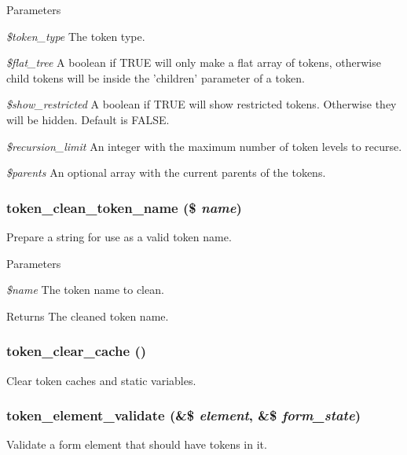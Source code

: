 \begin{DoxyParams}{Parameters}
\item[{\em \$token\_\-type}]The token type. \item[{\em \$flat\_\-tree}]A boolean if TRUE will only make a flat array of tokens, otherwise child tokens will be inside the 'children' parameter of a token. \item[{\em \$show\_\-restricted}]A boolean if TRUE will show restricted tokens. Otherwise they will be hidden. Default is FALSE. \item[{\em \$recursion\_\-limit}]An integer with the maximum number of token levels to recurse. \item[{\em \$parents}]An optional array with the current parents of the tokens. \end{DoxyParams}
\hypertarget{token_8module_aa3b8e39ad2ee70c9b913d3b3ba07917f}{
\subsubsection[{token\_\-clean\_\-token\_\-name}]{\setlength{\rightskip}{0pt plus 5cm}token\_\-clean\_\-token\_\-name (\$ {\em name})}}
\label{token_8module_aa3b8e39ad2ee70c9b913d3b3ba07917f}
Prepare a string for use as a valid token name.


\begin{DoxyParams}{Parameters}
\item[{\em \$name}]The token name to clean. \end{DoxyParams}
\begin{DoxyReturn}{Returns}
The cleaned token name. 
\end{DoxyReturn}
\hypertarget{token_8module_ac9fcda26ddadebfc7f94485fc20a3c3e}{
\subsubsection[{token\_\-clear\_\-cache}]{\setlength{\rightskip}{0pt plus 5cm}token\_\-clear\_\-cache ()}}
\label{token_8module_ac9fcda26ddadebfc7f94485fc20a3c3e}
Clear token caches and static variables. \hypertarget{token_8module_acaac5d083e5f83323e9e2914223a729e}{
\subsubsection[{token\_\-element\_\-validate}]{\setlength{\rightskip}{0pt plus 5cm}token\_\-element\_\-validate (\&\$ {\em element}, \/  \&\$ {\em form\_\-state})}}
\label{token_8module_acaac5d083e5f83323e9e2914223a729e}
Validate a form element that should have tokens in it.

